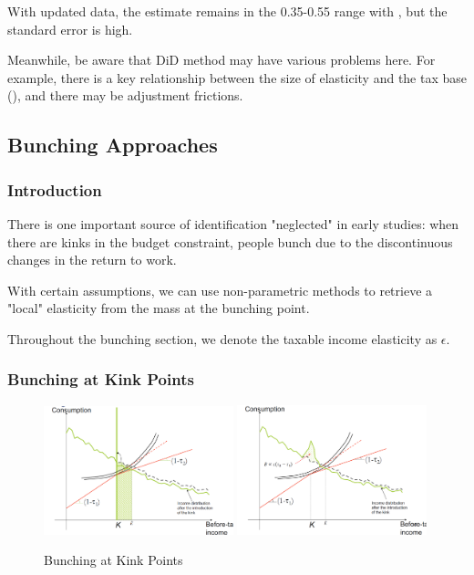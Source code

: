                 With updated data, the estimate remains in the 0.35-0.55 range with , but the standard error is high.

                Meanwhile, be aware that DiD method may have various problems here. For example, there is a key relationship between the size of elasticity and the tax base (\cite{slemrod_optimal_2002}), and there may be adjustment frictions.

        \subsection{Bunching Approaches}

            \subsubsection{Introduction}

                There is one important source of identification "neglected" in early studies: when there are kinks in the budget constraint, people bunch due to the discontinuous changes in the return to work.

                With certain assumptions, we can use non-parametric methods to retrieve a "local" elasticity from the mass at the bunching point.

                Throughout the bunching section, we denote the taxable income elasticity as $\epsilon$.

            \subsubsection{Bunching at Kink Points}

                \begin{figure}[H]
                    \centering
                    \includegraphics[width=0.49\textwidth]{images/ch13/13_bunching_1.png}
                    \includegraphics[width=0.49\textwidth]{images/ch13/13_bunching_2.png}
                    \caption{Bunching at Kink Points}
                \end{figure}


